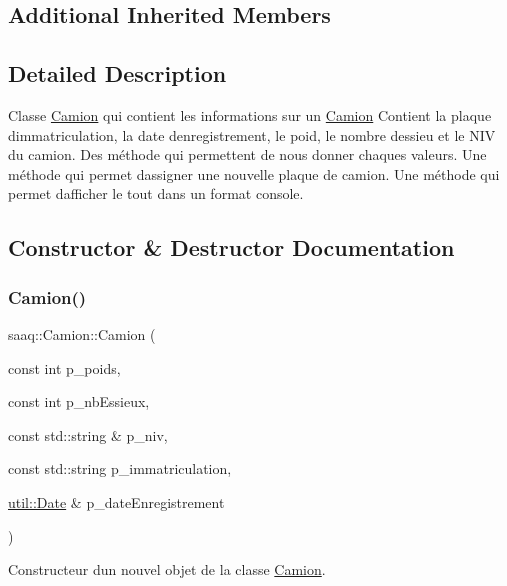 \subsection*{Additional Inherited Members}


\subsection{Detailed Description}
Classe \hyperlink{classsaaq_1_1Camion}{Camion} qui contient les informations sur un \hyperlink{classsaaq_1_1Camion}{Camion} Contient la plaque d\textquotesingle{}immatriculation, la date d\textquotesingle{}enregistrement, le poid, le nombre d\textquotesingle{}essieu et le N\+IV du camion. Des méthode qui permettent de nous donner chaques valeurs. Une méthode qui permet d\textquotesingle{}assigner une nouvelle plaque de camion. Une méthode qui permet d\textquotesingle{}afficher le tout dans un format console. 

\subsection{Constructor \& Destructor Documentation}
\mbox{\label{classsaaq_1_1Camion_ab81877c7ca4c636c4488c09a6b7fabba}} 
\subsubsection{\texorpdfstring{Camion()}{Camion()}}
{\footnotesize\ttfamily saaq\+::\+Camion\+::\+Camion (\begin{DoxyParamCaption}\item[{const int}]{p\+\_\+poids,  }\item[{const int}]{p\+\_\+nb\+Essieux,  }\item[{const std\+::string \&}]{p\+\_\+niv,  }\item[{const std\+::string}]{p\+\_\+immatriculation,  }\item[{\hyperlink{classutil_1_1Date}{util\+::\+Date} \&}]{p\+\_\+date\+Enregistrement }\end{DoxyParamCaption})}



Constructeur d\textquotesingle{}un nouvel objet de la classe \hyperlink{classsaaq_1_1Camion}{Camion}. 


